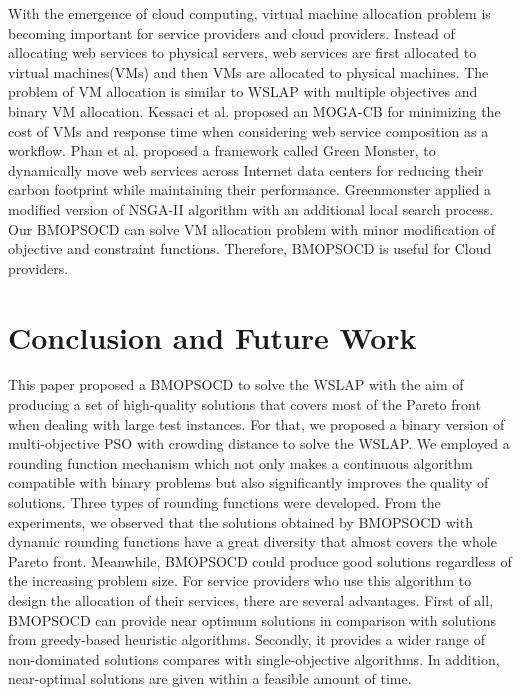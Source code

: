 \documentclass[10pt,journal,compsoc]{IEEEtran}
\begin{document}
With the emergence of cloud computing, virtual machine allocation problem is becoming important for service providers and cloud providers. Instead of allocating web services to physical servers, web services are first allocated to virtual machines(VMs) and then VMs are allocated to physical machines. The problem of VM allocation is 
similar to WSLAP with multiple objectives and binary VM allocation. Kessaci et al. \cite{6557869} proposed an MOGA-CB for minimizing the cost of VMs and response time when considering web service composition as a workflow. Phan et al. \cite{Phan8} proposed a framework called Green Monster, to dynamically move web services across Internet data centers for reducing their carbon footprint while maintaining their performance. Greenmonster applied a modified version of NSGA-II algorithm \cite{nsgaii} with an additional local search process. Our BMOPSOCD can solve VM allocation problem with minor modification of objective and constraint functions. Therefore, 
BMOPSOCD is useful for Cloud providers.


\vspace{-3 mm}
\section{Conclusion and Future Work} \label{sec:conclusion}

This paper proposed a BMOPSOCD to solve the WSLAP with the aim of producing a set of high-quality solutions that covers most of the Pareto front when dealing with large test instances. For that, we proposed a binary version of multi-objective PSO with crowding distance to solve the WSLAP. We employed a rounding function mechanism which not only makes a continuous algorithm compatible with binary problems but also significantly improves the quality of solutions. Three types of rounding functions were developed. From the experiments, we observed that the solutions obtained by BMOPSOCD with dynamic rounding functions have a great diversity that almost covers the whole Pareto front. Meanwhile, BMOPSOCD could produce good solutions regardless of the increasing problem size. For service providers who use this algorithm to design the allocation of their services, there are several advantages. First of all, BMOPSOCD can provide near optimum solutions in comparison with solutions from greedy-based heuristic algorithms. Secondly, it provides a wider range of non-dominated solutions compares with single-objective algorithms. In addition, near-optimal solutions are given within a feasible amount of time.
\end{document}
